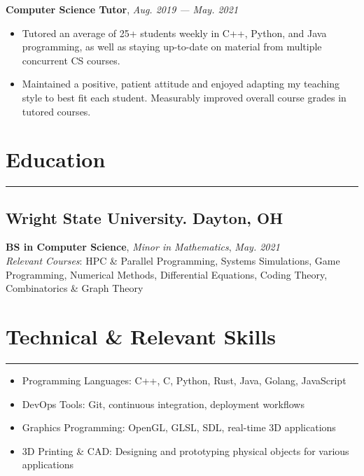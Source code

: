 \documentclass[12pt]{resume}
\begin{document}
\vspace{0.4em}
\textbf{Computer Science Tutor}, \textit{Aug. 2019 --- May. 2021}\\
\vspace{0.15em}
\begin{minipage}{\linewidth}
    \begin{itemize}
        \item Tutored an average of 25+ students weekly in C++, Python, and Java programming, as well as staying up-to-date on material from multiple concurrent CS courses. 
        \item Maintained a positive, patient attitude and enjoyed adapting my teaching style to best fit each student. Measurably improved overall course grades in tutored courses.
    \end{itemize}
\end{minipage}

\section{Education}
\vspace{-0.5em}
\rule{7.5in}{0.2pt}
\vspace{-1.85em}
\subsection{Wright State University. Dayton, OH}
\textbf{BS in Computer Science}, \textit{Minor in Mathematics}, \textit{May. 2021}\\
\textit{Relevant Courses}: HPC \& Parallel Programming, Systems Simulations, Game Programming, Numerical Methods, Differential Equations, Coding Theory, Combinatorics \& Graph Theory\\

\section{Technical \& Relevant Skills}
\vspace{-0.5em}
\rule{7.5in}{0.2pt}
\vspace{-0.775em}

\begin{minipage}{\linewidth}
    \begin{itemize}
        \item Programming Languages: C++, C, Python, Rust, Java, Golang, JavaScript
        \item DevOps Tools: Git, continuous integration, deployment workflows
        \item Graphics Programming: OpenGL, GLSL, SDL, real-time 3D applications
        \item 3D Printing \& CAD: Designing and prototyping physical objects for various applications
    \end{itemize}
\end{minipage}
\end{document}
